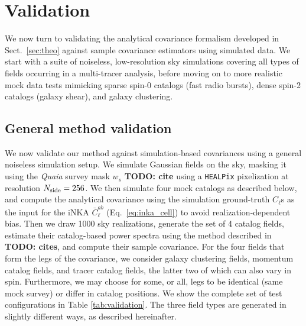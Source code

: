 \documentclass[aps,twocolumn, superscriptaddress, english, nofootinbib, 10pt]{revtex4-2}
\newcommand{\todo}[1]{{\color{blue}\bf TODO: #1}}
\begin{document}
\section{Validation}\label{sec:val}
  We now turn to validating the analytical covariance formalism developed in Sect.~\ref{sec:theo} against sample covariance estimators using simulated data. We start with a suite of noiseless, low-resolution sky simulations covering all types of fields occurring in a multi-tracer analysis, before moving on to more realistic mock data tests mimicking sparse spin-0 catalogs (fast radio bursts), dense spin-2 catalogs (galaxy shear), and galaxy clustering.
  \subsection{General method validation}\label{ssec:val.general}
    We now validate our method against simulation-based covariances using a general noiseless simulation setup. We simulate Gaussian fields on the sky, masking it using the {\it Quaia} survey mask $w_s$ \todo{cite} using a \texttt{HEALPix} pixelization at resolution $N_{\rm side}=256$. We then simulate four mock catalogs as described below, and compute the analytical covariance using the simulation ground-truth $C_\ell$s as the input for the iNKA $\bar{C}_\ell^{ab}$ (Eq.~\ref{eq:inka_cell}) to avoid realization-dependent bias. Then we draw 1000 sky realizations, generate the set of 4 catalog fields, estimate their catalog-based power spectra using the method described in \todo{cites}, and compute their sample covariance. For the four fields that form the legs of the covariance, we consider galaxy clustering fields, momentum catalog fields, and tracer catalog fields, the latter two of which can also vary in spin. Furthermore, we may choose for some, or all, legs to be identical (same mock survey) or differ in catalog positions. We show the complete set of test configurations in Table \ref{tab:validation}. The three field types are generated in slightly different ways, as described hereinafter.
\end{document}
